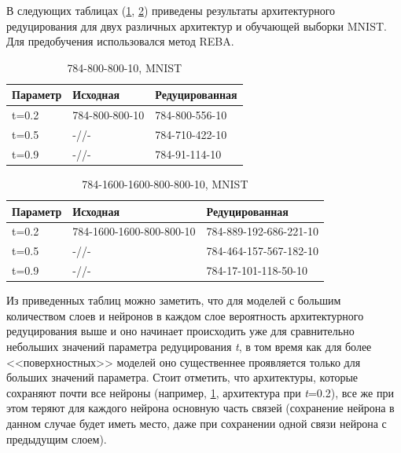В следующих таблицах (\ref{table:architect_reduce_mnist_one}, \ref{table:architect_reduce_mnist_two}) приведены результаты архитектурного редуцирования для двух различных архитектур и обучающей выборки MNIST. Для предобучения использовался метод REBA.

\begin{table} [!h]
  \small
  \caption{784-800-800-10, MNIST}\label{table:architect_reduce_mnist_one}
    \centering
    \begin{tabular}{| p{2cm} | p{6cm} | p{6cm} |}
    \hline
        \textbf{Параметр} & \textbf{Исходная} & \textbf{Редуцированная}\\
    \hline
    t=0.2 & 784-800-800-10 & 784-800-556-10\\
    \hline
    t=0.5 & -//- & 784-710-422-10\\
    \hline
    t=0.9 & -//- & 784-91-114-10\\
    \hline
    \end{tabular}
    \end{table}
    
\begin{table} [!h]
  \small
    \caption{784-1600-1600-800-800-10, MNIST}\label{table:architect_reduce_mnist_two}
    \centering
    \begin{tabular}{| p{2cm} | p{6cm} | p{6cm} |}
    \hline
        \textbf{Параметр} & \textbf{Исходная} & \textbf{Редуцированная}\\
    \hline
    t=0.2 & 784-1600-1600-800-800-10 & 784-889-192-686-221-10\\
    \hline
    t=0.5 & -//- & 784-464-157-567-182-10\\
    \hline
    t=0.9 & -//- & 784-17-101-118-50-10\\
    \hline
    \end{tabular}
    \end{table}
    
Из приведенных таблиц можно заметить, что для моделей с большим количеством слоев и нейронов в каждом слое вероятность архитектурного редуцирования выше и оно начинает происходить уже для сравнительно небольших значений параметра редуцирования \textit{t}, в том время как для более <<поверхностных>> моделей оно существеннее проявляется только для больших значений параметра. Стоит отметить, что архитектуры, которые сохраняют почти все нейроны (например, \ref{table:architect_reduce_mnist_one}, архитектура при \textit{t}=0.2), все же при этом теряют для каждого нейрона основную часть связей (сохранение нейрона в данном случае будет иметь место, даже при сохранении одной связи нейрона с предыдущим слоем).

